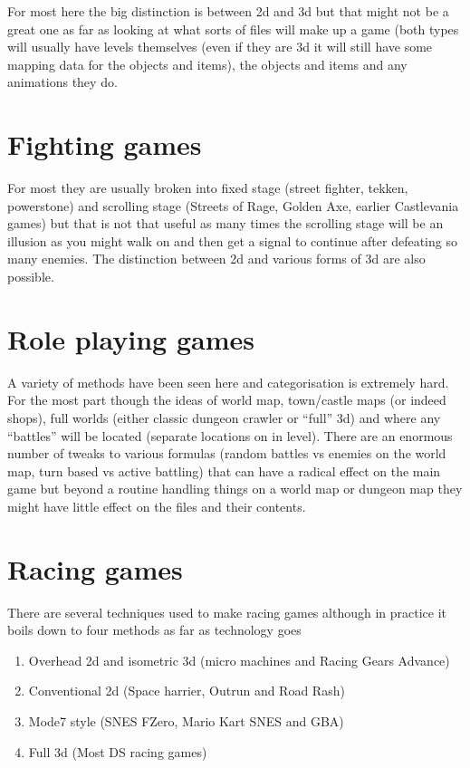 \documentclass[
]{book}
\providecommand{\tightlist}{%
  \setlength{\itemsep}{0pt}\setlength{\parskip}{0pt}}
\begin{document}
For most here the big distinction is between 2d and 3d but that might not be a great one as far as looking at what sorts of files will make up a game (both types will usually have levels themselves (even if they are 3d it will still have some mapping data for the objects and items), the objects and items and any animations they do.

\hypertarget{fighting-games}{%
\section{Fighting games}\label{fighting-games}}

For most they are usually broken into fixed stage (street fighter, tekken, powerstone) and scrolling stage (Streets of Rage, Golden Axe, earlier Castlevania games) but that is not that useful as many times the scrolling stage will be an illusion as you might walk on and then get a signal to continue after defeating so many enemies. The distinction between 2d and various forms of 3d are also possible.

\hypertarget{role-playing-games}{%
\section{Role playing games}\label{role-playing-games}}

A variety of methods have been seen here and categorisation is extremely hard. For the most part though the ideas of world map, town/castle maps (or indeed shops), full worlds (either classic dungeon crawler or ``full'' 3d) and where any ``battles'' will be located (separate locations on in level). There are an enormous number of tweaks to various formulas (random battles vs enemies on the world map, turn based vs active battling) that can have a radical effect on the main game but beyond a routine handling things on a world map or dungeon map they might have little effect on the files and their contents.

\hypertarget{racing-games}{%
\section{Racing games}\label{racing-games}}

There are several techniques used to make racing games although in practice it boils down to four methods as far as technology goes

\begin{enumerate}
\def\labelenumi{\arabic{enumi}.}
\tightlist
\item
  Overhead 2d and isometric 3d (micro machines and Racing Gears Advance)
\item
  Conventional 2d (Space harrier, Outrun and Road Rash)
\item
  Mode7 style (SNES FZero, Mario Kart SNES and GBA)
\item
  Full 3d (Most DS racing games)
\end{enumerate}
\end{document}
